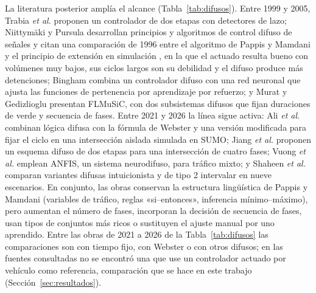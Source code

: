 \documentclass[journal]{IEEEtran}
\begin{document}
La literatura posterior amplía el alcance (Tabla~\ref{tab:difusos}). Entre 1999 y 2005, Trabia \emph{et al.} \cite{Trabia1999} proponen un controlador de dos etapas con detectores de lazo; Niittymäki y Pursula \cite{Niittymaki2000} desarrollan principios y algoritmos de control difuso de señales y citan una comparación de 1996 entre el algoritmo de Pappis y Mamdani y el principio de extensión en simulación \cite{Pursula1996}, en la que el actuado resulta bueno con volúmenes muy bajos, sus ciclos largos son su debilidad y el difuso produce más detenciones; Bingham \cite{Bingham2001} combina un controlador difuso con una red neuronal que ajusta las funciones de pertenencia por aprendizaje por refuerzo; y Murat y Gedizlioglu \cite{Murat2005} presentan FLMuSiC, con dos subsistemas difusos que fijan duraciones de verde y secuencia de fases. Entre 2021 y 2026 la línea sigue activa: Ali \emph{et al.} \cite{Ali2021} combinan lógica difusa con la fórmula de Webster y una versión modificada para fijar el ciclo en una intersección aislada simulada en SUMO; Jiang \emph{et al.} \cite{Jiang2021} proponen un esquema difuso de dos etapas para una intersección de cuatro fases; Vuong \emph{et al.} \cite{Vuong2021} emplean ANFIS, un sistema neurodifuso, para tráfico mixto; y Shaheen \emph{et al.} \cite{Shaheen2026} comparan variantes difusas intuicionista y de tipo 2 intervalar en nueve escenarios. En conjunto, las obras conservan la estructura lingüística de Pappis y Mamdani (variables de tráfico, reglas «si–entonces», inferencia mínimo–máximo), pero aumentan el número de fases, incorporan la decisión de secuencia de fases, usan tipos de conjuntos más ricos o sustituyen el ajuste manual por uno aprendido. Entre las obras de 2021 a 2026 de la Tabla~\ref{tab:difusos} las comparaciones son con tiempo fijo, con Webster o con otros difusos; en las fuentes consultadas no se encontró una que use un controlador actuado por vehículo como referencia, comparación que se hace en este trabajo (Sección~\ref{sec:resultados}).
\end{document}
